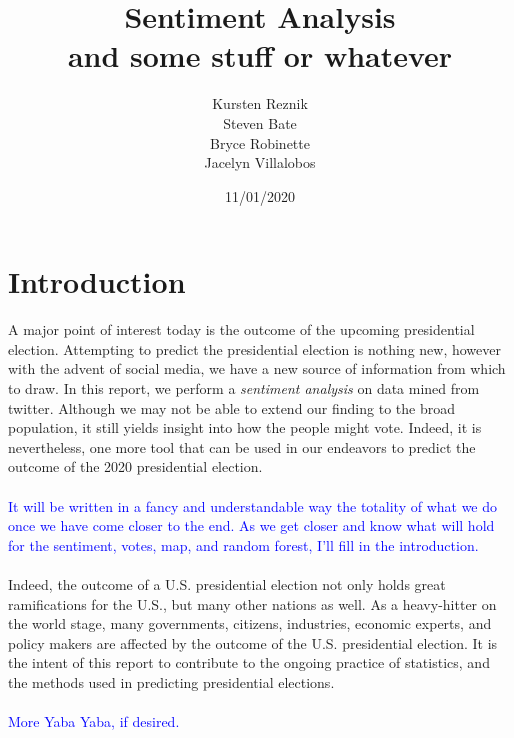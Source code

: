\documentclass[11pt, oneside]{article}
\title{Sentiment Analysis\\
\small{and some stuff or whatever}
}
\author{\hspace{1.5cm}\parbox[t][2.5cm][t]{4cm}{
	Kursten Reznik\\
	Steven Bate
}
\parbox[t][2.5cm][t]{4cm}{
	Bryce Robinette\\
	Jacelyn Villalobos
}
}
\date{11/01/2020}
\begin{document}
\maketitle

\pagebreak

\tableofcontents

\pagebreak

\section{Introduction}
A major point of interest today is the outcome of the upcoming presidential election. Attempting to predict the presidential election is nothing new, however with the advent of social media, we have a new source of information from which to draw. In this report, we perform a \emph{sentiment analysis} on data mined from twitter. Although we may not be able to extend our finding to the broad population, it still yields insight into how the people might vote. Indeed, it is nevertheless, one more tool that can be used in our endeavors to predict the outcome of the 2020 presidential election.\\
\\
\textcolor{blue}{It will be written in a fancy and understandable way the totality of what we do once we have come closer to the end. As we get closer and know what will hold for the sentiment, votes, map, and random forest, I'll fill in the introduction.}\\
\\
Indeed, the outcome of a U.S. presidential election not only holds great ramifications for the U.S., but many other nations as well. As a heavy-hitter on the world stage, many governments, citizens, industries, economic experts, and policy makers are affected by the outcome of the U.S. presidential election. It is the intent of this report to contribute to the ongoing practice of statistics, and the methods used in predicting presidential elections.\\
\\
\textcolor{blue}{More Yaba Yaba, if desired.}\\ 
\end{document}
